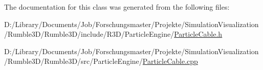 The documentation for this class was generated from the following files\+:\begin{DoxyCompactItemize}
\item 
D\+:/\+Library/\+Documents/\+Job/\+Forschungsmaster/\+Projekte/\+Simulation\+Visualization/\+Rumble3\+D/\+Rumble3\+D/include/\+R3\+D/\+Particle\+Engine/\mbox{\hyperlink{_particle_cable_8h}{Particle\+Cable.\+h}}\item 
D\+:/\+Library/\+Documents/\+Job/\+Forschungsmaster/\+Projekte/\+Simulation\+Visualization/\+Rumble3\+D/\+Rumble3\+D/src/\+Particle\+Engine/\mbox{\hyperlink{_particle_cable_8cpp}{Particle\+Cable.\+cpp}}\end{DoxyCompactItemize}
